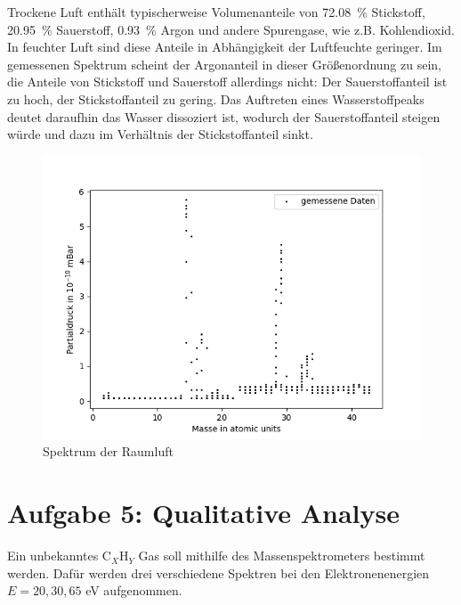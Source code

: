 Trockene Luft enthält typischerweise Volumenanteile von \SI{72.08}{\%} Stickstoff, \SI{20.95}{\%} Sauerstoff, \SI{0.93}{\%} Argon und andere Spurengase, wie z.B. Kohlendioxid\cite{Luft}. In feuchter Luft sind diese Anteile in Abhängigkeit der Luftfeuchte geringer. Im gemessenen Spektrum scheint der Argonanteil in dieser Größenordnung zu sein, die Anteile von Stickstoff und Sauerstoff allerdings nicht: Der Sauerstoffanteil ist zu hoch, der Stickstoffanteil zu gering. Das Auftreten eines Wasserstoffpeaks deutet daraufhin das Wasser dissoziert ist, wodurch der Sauerstoffanteil steigen würde und dazu im Verhältnis der Stickstoffanteil sinkt.


\begin{figure}[H]
    \centering
    \includegraphics[width=120mm,scale=0.8]{Massenspektrometer/include/MSzweitesSpektrum.png}
    \caption{Spektrum der Raumluft}
    \label{fig:MSzweitesSpektrum}
\end{figure}

\section{Aufgabe 5: Qualitative Analyse}
Ein unbekanntes $\text{C}_X\text{H}_Y$ Gas soll mithilfe des Massenspektrometers bestimmt werden. Dafür werden drei verschiedene Spektren bei den Elektronenenergien $E = {20,30,65} $ eV aufgenommen.

